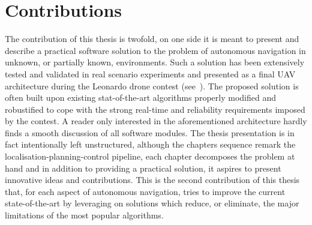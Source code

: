 \section{Contributions}%
\label{SEC:CONTRIBUTIONS}
The contribution of this thesis is twofold, on one side it is meant to present and describe a practical software solution
to the problem of autonomous navigation in unknown, or partially known, environments.
Such a solution has been extensively tested and validated in real scenario experiments and presented as a final UAV architecture
during the Leonardo drone contest (see~).
The proposed solution is often built upon existing stat-of-the-art algorithms properly modified and robustified to cope with
the strong real-time and reliability requirements imposed by the contest.
A reader only interested in the aforementioned architecture hardly finds a smooth discussion of all software modules.
The thesis presentation is in fact intentionally left unstructured, although the chapters sequence remark the
localisation-planning-control pipeline, each chapter decomposes the problem at hand and in addition to providing a
practical solution, it aspires to present innovative ideas and contributions.
This is the second contribution of this thesis that, for each aspect of autonomous navigation, tries to improve
the current state-of-the-art by leveraging on solutions which reduce, or eliminate, the major limitations of the
most popular algorithms.

